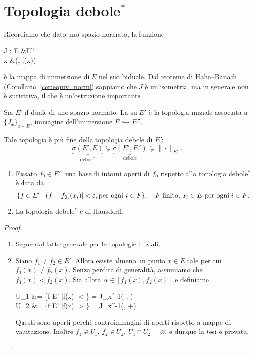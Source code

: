 \section{Topologia debole$^*$}
Ricordiamo che dato uno spazio normato, la funzione
\begin{eqalign}
	J : E &\longto E''\\
	x &\longmapsto (f \mapsto f(x))
\end{eqalign}
è la mappa di immersione di $E$ nel suo biduale. Dal teorema di Hahn--Banach (Corollario~\ref{cor:equiv_norm}) sappiamo che $J$ è un'isometria, ma in generale non è suriettiva, il che è un'ostruzione importante.

\begin{definition}
	Sia $E'$ il duale di uno spazio normato. La  su $E'$ è la topologia iniziale associata a $\{J_x\}_{x \in E}$, immagine dell'immersione $E \hookrightarrow E''$.
\end{definition}

\begin{remark}
	Tale topologia è più fine della topologia debole di $E'$:
	\begin{equation*}
		\underbrace{\sigma(E',E)}_{\text{debole}^*} \subsetneq \underbrace{\sigma(E',E'')}_{\text{debole}} \subsetneq \|\cdot\|_{E'}.
	\end{equation*}
\end{remark}

\begin{lemma}
	\leavevmode
	\begin{enumerate}
		\item Fissato $f_0 \in E'$, una base di intorni aperti di $f_0$ rispetto alla topologia debole$^*$ è data da
		\begin{equation*}
			\{f \in E' \,|\, |(f-f_0)(x_i)| < \varepsilon, \text{per ogni $i \in F$}\}, \quad \text{$F$ finito, $x_i \in E$ per ogni $i \in F$.}
		\end{equation*}
		\item La topologia debole$^*$ è di Hausdorff.
	\end{enumerate}
\end{lemma}
\begin{proof}
	\leavevmode
	\begin{enumerate}
		\item Segue dal fatto generale per le topologie iniziali.
		\item Siano $f_1 \neq f_2 \in E'$. Allora esiste almeno un punto $x \in E$ tale per cui $f_1(x) \neq f_2(x)$. Senza perdita di generalità, assumiamo che $f_1(x) < f_2(x)$. Sia allora $\alpha \in [f_1(x), f_2(x)]$ e definiamo
		\begin{eqalign*}
			U_1 &= \{f \in E' \suchthat |f(x)| < \alpha\} = J_x^{-1}(-\infty, \alpha)\\
			U_2 &= \{f \in E' \suchthat |f(x)| > \alpha\} = J_x^{-1}(\alpha, +\infty).
		\end{eqalign*}
		Questi sono aperti perchè controimmagini di aperti rispetto a mappe di valutazione. Inoltre $f_1 \in U_1$, $f_2 \in U_2$, $U_1 \cap U_2 = \varnothing$, e dunque la tesi è provata.
	\end{enumerate}
\end{proof}

